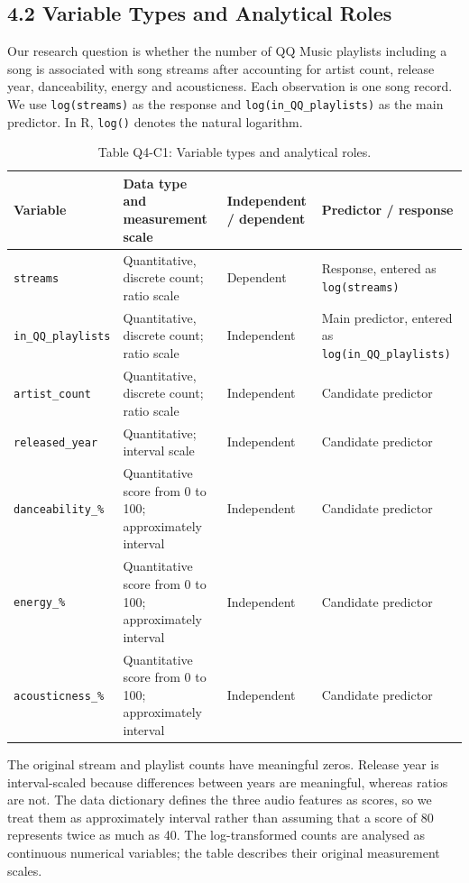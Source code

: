 \FloatBarrier
\subsection*{4.2 Variable Types and Analytical Roles}

Our research question is whether the number of QQ Music playlists including a song is associated with song streams after accounting for artist count, release year, danceability, energy and acousticness. Each observation is one song record. We use \texttt{log(streams)} as the response and \texttt{log(in\_QQ\_playlists)} as the main predictor. In R, \texttt{log()} denotes the natural logarithm.

\begin{table}[htbp]
  \centering
  \small
  \caption*{Table Q4-C1: Variable types and analytical roles.}
  \setlength{\tabcolsep}{3.5pt}
  \begin{tabular}{p{2.9cm}p{5.4cm}p{2.1cm}p{4.3cm}}
    \toprule
    Variable & Data type and measurement scale & Independent / dependent & Predictor / response \\
    \midrule
    \texttt{streams} & Quantitative, discrete count; ratio scale & Dependent & Response, entered as \texttt{log(streams)} \\
    \texttt{in\_QQ\_playlists} & Quantitative, discrete count; ratio scale & Independent & Main predictor, entered as \texttt{log(in\_QQ\_playlists)} \\
    \texttt{artist\_count} & Quantitative, discrete count; ratio scale & Independent & Candidate predictor \\
    \texttt{released\_year} & Quantitative; interval scale & Independent & Candidate predictor \\
    \texttt{danceability\_\%} & Quantitative score from 0 to 100; approximately interval & Independent & Candidate predictor \\
    \texttt{energy\_\%} & Quantitative score from 0 to 100; approximately interval & Independent & Candidate predictor \\
    \texttt{acousticness\_\%} & Quantitative score from 0 to 100; approximately interval & Independent & Candidate predictor \\
    \bottomrule
  \end{tabular}
\end{table}

The original stream and playlist counts have meaningful zeros. Release year is interval-scaled because differences between years are meaningful, whereas ratios are not. The data dictionary defines the three audio features as scores, so we treat them as approximately interval rather than assuming that a score of 80 represents twice as much as 40. The log-transformed counts are analysed as continuous numerical variables; the table describes their original measurement scales.

